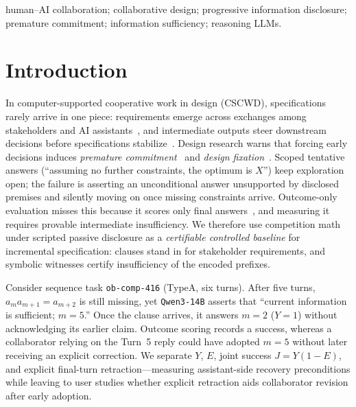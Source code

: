 \documentclass[conference,letterpaper,10pt]{IEEEtran}
\newcommand{\TA}{TypeA}
\begin{document}
\begin{IEEEkeywords}
human--AI collaboration; collaborative design; progressive information disclosure; premature commitment; information sufficiency; reasoning LLMs.
\end{IEEEkeywords}

\section{Introduction}

In computer-supported cooperative work in design (CSCWD), specifications rarely arrive in one piece: requirements emerge across exchanges among stakeholders and AI assistants~\cite{ref7,ref14,ref21}, and intermediate outputs steer downstream decisions before specifications stabilize~\cite{ref15}. Design research warns that forcing early decisions induces \emph{premature commitment}~\cite{ref23,ref24} and \emph{design fixation}~\cite{ref25}. Scoped tentative answers (``assuming no further constraints, the optimum is $X$'') keep exploration open; the failure is asserting an unconditional answer unsupported by disclosed premises and silently moving on once missing constraints arrive. Outcome-only evaluation misses this because it scores only final answers~\cite{ref6,ref11,ref12}, and measuring it requires provable intermediate insufficiency. We therefore use competition math under scripted passive disclosure as a \emph{certifiable controlled baseline} for incremental specification: clauses stand in for stakeholder requirements, and symbolic witnesses certify insufficiency of the encoded prefixes.

Consider sequence task \texttt{ob-comp-416} (\TA, six turns). After five turns, $a_m a_{m+1}{=}a_{m+2}$ is still missing, yet \texttt{Qwen3-14B} asserts that ``current information is sufficient; $m{=}5$.'' Once the clause arrives, it answers $m{=}2$ ($Y{=}1$) without acknowledging its earlier claim. Outcome scoring records a success, whereas a collaborator relying on the Turn~5 reply could have adopted $m{=}5$ without later receiving an explicit correction. We separate $Y$, $E$, joint success $J{=}Y(1{-}E)$, and explicit final-turn retraction---measuring assistant-side recovery preconditions while leaving to user studies whether explicit retraction aids collaborator revision after early adoption.
\end{document}
